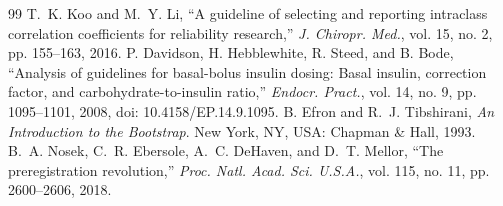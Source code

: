 \documentclass[journal]{IEEEtran}
\begin{document}
\begin{thebibliography}{99}
\label{ref76label} T.~K. Koo and M.~Y. Li, ``A guideline of selecting and reporting intraclass correlation coefficients for reliability research,'' \emph{J. Chiropr. Med.}, vol. 15, no. 2, pp. 155--163, 2016.
\label{ref77label} P. Davidson, H. Hebblewhite, R. Steed, and B. Bode, ``Analysis of guidelines for basal-bolus insulin dosing: Basal insulin, correction factor, and carbohydrate-to-insulin ratio,'' \emph{Endocr. Pract.}, vol. 14, no. 9, pp. 1095--1101, 2008, doi: 10.4158/EP.14.9.1095.
\label{ref78label} B. Efron and R.~J. Tibshirani, \emph{An Introduction to the Bootstrap}. New York, NY, USA: Chapman \& Hall, 1993.
\label{ref79label} B.~A. Nosek, C.~R. Ebersole, A.~C. DeHaven, and D.~T. Mellor, ``The preregistration revolution,'' \emph{Proc. Natl. Acad. Sci. U.S.A.}, vol. 115, no. 11, pp. 2600--2606, 2018.


\end{thebibliography}
\end{document}
